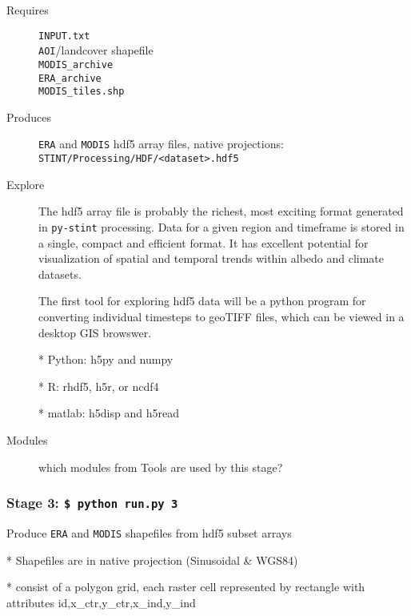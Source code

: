 \documentclass[twoside,a4paper]{refart}
\begin{document}
  \begin{description}
    \item [Requires]
          \texttt{INPUT.txt} \\
          \texttt{AOI}/landcover shapefile \\
          \texttt{MODIS\_archive} \\
          \texttt{ERA\_archive} \\
          \texttt{MODIS\_tiles.shp}
  
  
    \item [Produces]
      \texttt{ERA} and \texttt{MODIS} hdf5 array files, native projections:\\
      \texttt{STINT/Processing/HDF/<dataset>.hdf5}
      

    \item [Explore]
      The hdf5 array file is probably the richest, most exciting format 
      generated in \texttt{py-stint} processing. Data for a given region 
      and timeframe is stored in a single, compact and efficient format. 
      It has excellent potential for visualization of spatial and temporal 
      trends within albedo and climate datasets. 
      
      The first tool for exploring hdf5 data will be a python program for
       converting individual timesteps to geoTIFF files, which can be 
       viewed in a desktop GIS browswer.
      
      
      * Python: h5py and numpy
      
      * R: rhdf5, h5r, or ncdf4 
      
      * matlab: h5disp and h5read

    \item [Modules]
      which modules from Tools are used by this stage?
  \end{description}


\subsubsection{\textbf{Stage 3:} \texttt{\$ python run.py 3}}
        Produce \texttt{ERA} and \texttt{MODIS} shapefiles from hdf5 subset arrays
        
        * Shapefiles are in native projection (Sinusoidal \& WGS84)
        
        * consist of a polygon grid, each raster cell represented by
          rectangle with attributes id,x\_ctr,y\_ctr,x\_ind,y\_ind
\end{document}
